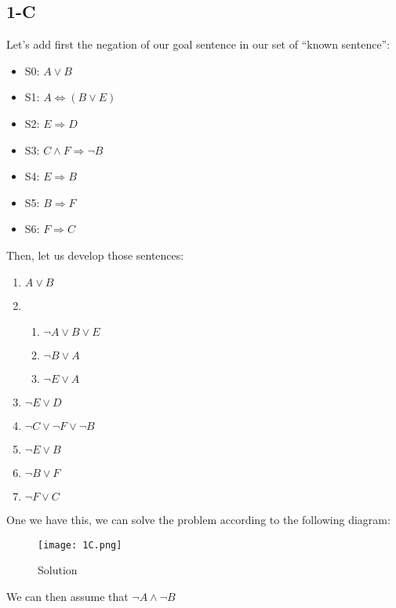 \documentclass{article}
\begin{document}
        \subsection{1-C}
            Let's add first the negation of our goal sentence in our set of ``known sentence'':\\
            \begin{itemize}
                \item S0: $A\lor B$
                \item S1: $A \Leftrightarrow (B\lor E)$
                \item S2: $E\Rightarrow D$
                \item S3: $C\land F\Rightarrow \lnot B$
                \item S4: $E\Rightarrow B$
                \item S5: $B\Rightarrow F$
                \item S6: $F\Rightarrow C$
            \end{itemize}
            Then, let us develop those sentences:
            \begin{enumerate}
                \item $A\lor B$
                \item 
                    \begin{enumerate}
                        \item $\lnot A\lor B \lor E$
                        \item $\lnot B\lor A$
                        \item $\lnot E \lor A$
                    \end{enumerate} 
                \item $\lnot E \lor D$
                \item $\lnot C \lor \lnot F \lor \lnot B$
                \item $\lnot E \lor B$
                \item $\lnot B\lor F$
                \item $\lnot F\lor C$
            \end{enumerate}
            One we have this, we can solve the problem according to the following diagram:\\
            \begin{figure}[H]
                \centering
                \texttt{[image: 1C.png]}
                \caption{Solution}
            \end{figure}
            We can then assume that $\lnot A\land \lnot B$
\end{document}
